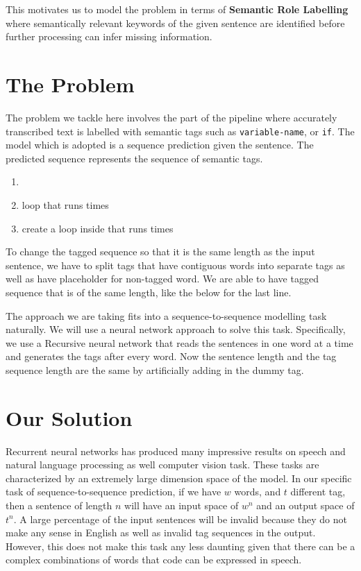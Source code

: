 \documentclass[fyp]{socreport}
\begin{document}
This motivates us to model the problem in terms of \textbf{Semantic Role
Labelling} where semantically relevant keywords of the given sentence are
identified before further processing can infer missing information.

\section{The Problem}

The problem we tackle here involves the part of the pipeline where accurately
transcribed text is labelled with semantic tags such as \texttt{variable-name},
or \texttt{if}. The model which is adopted is a sequence prediction given
the sentence. The predicted sequence represents the sequence of semantic tags.

\begin{enumerate}
  \item {}     
      
  \item {} loop that runs  times
  \item create a  loop inside that runs  times
\end{enumerate}

To change the tagged sequence so that it is the same length as the input
sentence, we have to split tags that have contiguous words into separate tags
as well as have placeholder for non-tagged word. We are able to have tagged
sequence that is of the same length, like the below for the last line.

\hspace{20pt}
     

The approach we are taking fits into a sequence-to-sequence modelling task
naturally. We will use a neural network approach to solve this task.
Specifically, we use a Recursive neural network that reads the sentences in one
word at a time and generates the tags after every word. Now the sentence
length and the tag sequence length are the same by artificially adding in the
dummy tag.


\section{Our Solution}
Recurrent neural networks has produced many impressive results on speech and
natural language processing as well computer vision task. These tasks are
characterized by an extremely large dimension space of the model. In our
specific task of sequence-to-sequence prediction, if we have $w$ words, and
$t$ different tag, then a sentence of length $n$ will have an input space
of $w^n$ and an output space of $t^n$. A large percentage of the input sentences
will be invalid because they do not make any sense in English as well as
invalid tag sequences in the output. However, this does not make this
task any less daunting given that there can be a complex combinations of words
that code can be expressed in speech.
\end{document}
